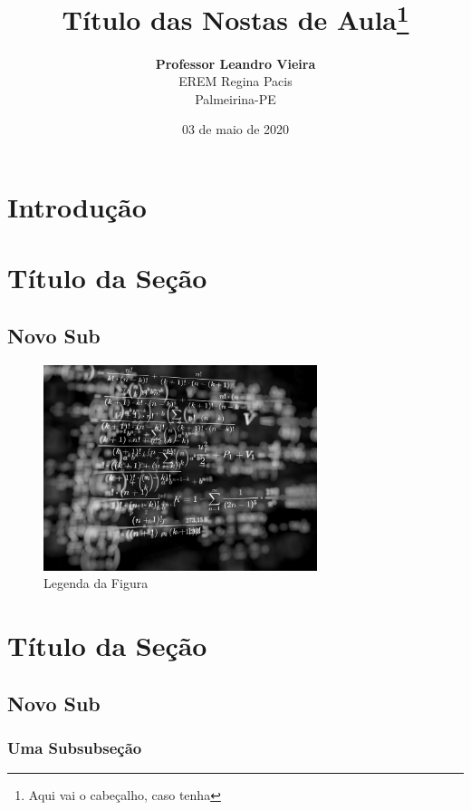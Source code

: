 \documentclass[oneside,a4paper,12pt]{article}
\title{\LINHAHORIZONTAL \\ Título das Nostas de Aula\footnote{Aqui vai o cabeçalho, caso tenha}}
\author{\textbf{Professor Leandro Vieira}\\EREM Regina Pacis\\Palmeirina-PE}
\date{03 de maio de 2020 \\ \LINHAHORIZONTAL}
\begin{document}
\maketitle

\tableofcontents

\section{Introdução}

\lipsum[1-2]

\section{Título da Seção}

\lipsum[1-2]

\lipsum[1-2]

\subsection{Novo Sub}

\lipsum[1-2]


	\begin{figure}[h]
	\center
	\includegraphics[width=8cm]{Figuras/imagem.jpg}
	\caption{Legenda da Figura}
	\label{rotulodafigura}
	\end{figure}

\lipsum[1-2]


\section{Título da Seção}

\lipsum[1-2]

\subsection{Novo Sub}

\lipsum[1-2]
	
\subsubsection{Uma Subsubseção} 

\lipsum[1-2]
\end{document}
